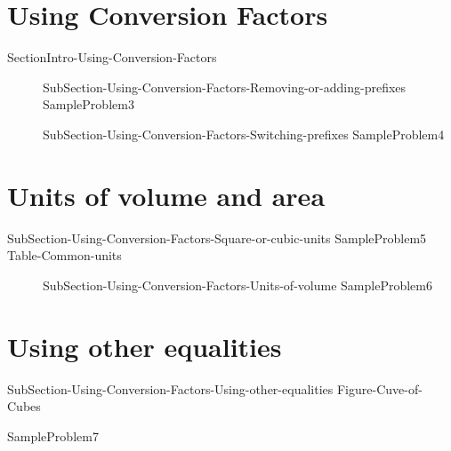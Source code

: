 \documentclass[main.tex]{subfiles}
\newcommand\chapterlabel{Ch-measurements}\setcounter{figurenewcounter}{0}\setcounter{tablenewcounter}{0}\setcounter{formulanewcounter}{0}\chapterpicture{../{\chapterlabel}/figure1}\chapterpicturelabel{PngImg}
\begin{document}
\section{Using Conversion Factors}
{SectionIntro-Using-Conversion-Factors}
\sloppy\begin{description}
\item[]{SubSection-Using-Conversion-Factors-Removing-or-adding-prefixes}
{SampleProblem3}%
\item[]{SubSection-Using-Conversion-Factors-Switching-prefixes}
{SampleProblem4}%
\end{description}

\section{Units of volume and area}
{SubSection-Using-Conversion-Factors-Square-or-cubic-units}
{SampleProblem5}%
{Table-Common-units}
\sloppy\begin{description}
\item[]{SubSection-Using-Conversion-Factors-Units-of-volume}
{SampleProblem6}%
\end{description}


\section{Using other equalities}
{SubSection-Using-Conversion-Factors-Using-other-equalities}
{Figure-Cuve-of-Cubes}

{SampleProblem7}%
\end{document}
